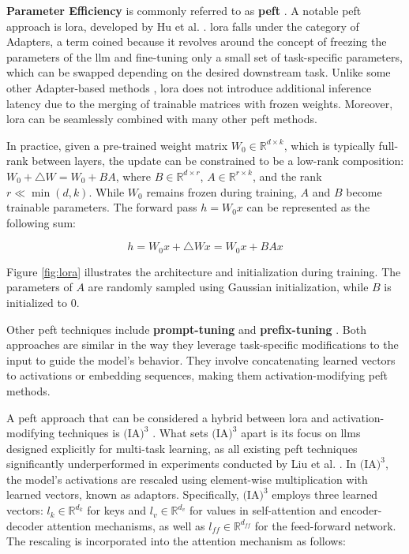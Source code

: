 \textbf{Parameter Efficiency} is commonly referred to as \textbf{\gls{peft}} \cite{noauthor_peft_nodate}. A notable \gls{peft} approach is \gls{lora}, developed by Hu et al. \cite{hu_lora_nodate}. \gls{lora} falls under the category of Adapters, a term coined because it revolves around the concept of freezing the parameters of the \gls{llm} and fine-tuning only a small set of task-specific parameters, which can be swapped depending on the desired downstream task. Unlike some other Adapter-based methods \cite{houlsby_parameter-efficient_2019}, \gls{lora} does not introduce additional inference latency due to the merging of trainable matrices with frozen weights. Moreover, \gls{lora} can be seamlessly combined with many other \gls{peft} methods.

In practice, given a pre-trained weight matrix \(W_0 \in \mathbb{R}^{d \times k}\), which is typically full-rank between layers, the update can be constrained to be a low-rank composition: \(W_0 + \triangle W = W_0 + BA\), where \(B \in \mathbb{R}^{d \times r}\), \(A \in \mathbb{R}^{r \times k}\), and the rank \(r \ll \min(d, k)\). While \(W_0\) remains frozen during training, \(A\) and \(B\) become trainable parameters. The forward pass \(h = W_0x\) can be represented as the following sum:

\begin{equation}
    h = W_0x + \triangle Wx = W_0x + BAx
\end{equation}

Figure \ref{fig:lora} illustrates the architecture and initialization during training. The parameters of \(A\) are randomly sampled using Gaussian initialization, while \(B\) is initialized to 0.

Other \gls{peft} techniques include \textbf{prompt-tuning} \cite{lester_power_2021} and \textbf{prefix-tuning} \cite{li_prefix-tuning_2021}. Both approaches are similar in the way they leverage task-specific modifications to the input to guide the model's behavior. They involve concatenating learned vectors to activations or embedding sequences, making them activation-modifying \gls{peft} methods.

A \gls{peft} approach that can be considered a hybrid between \gls{lora} and activation-modifying techniques is \textbf{$\text{(IA)}^3$} \cite{liu_few-shot_2022}. What sets $\text{(IA)}^3$ apart is its focus on \gls{llm}s designed explicitly for multi-task learning, as all existing \gls{peft} techniques significantly underperformed in experiments conducted by Liu et al. \cite{liu_few-shot_2022}. In $\text{(IA)}^3$, the model's activations are rescaled using element-wise multiplication with learned vectors, known as adaptors. Specifically, $\text{(IA)}^3$ employs three learned vectors: \(l_k \in \mathbb{R}^{d_k}\) for keys and \(l_v \in \mathbb{R}^{d_v}\) for values in self-attention and encoder-decoder attention mechanisms, as well as \(l_{ff} \in \mathbb{R}^{d_{ff}}\) for the feed-forward network. The rescaling is incorporated into the attention mechanism as follows:

